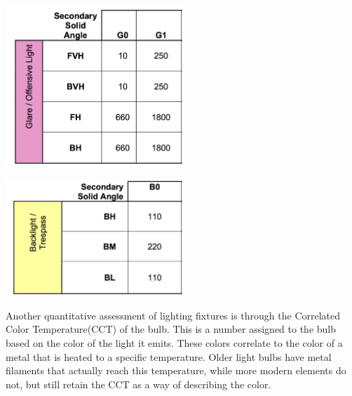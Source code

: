 \documentclass[12pt, oneside]{article}
\begin{document}
\begin{table}[p]
	\centering
	\includegraphics[width=0.5\textwidth]{glare01.jpg}
	\caption[BUG glare rating table]{The amount of lumens allowed in each solid angle - Front Very High (FVH), Back Very High (BVH), Front High (FH), and Back High (BH). This regulates the total amount of light emitted between 60\degree and 90\degree from the nadir.}
	\label{BUGlare2}
\end{table}
\begin{table}[p]
	\centering
	\includegraphics[width=0.5\textwidth]{backrate.jpg}
	\caption[BUG backlighting rating table]{The amount of lumens allowed in each solid angle - Back High (BH), Back Medium (BM), and Back Low (BL). This regulates the total amount of light emitted between 90\degree and 270\degree from the front of the fixture.}
	\label{Back}
\end{table}

Another quantitative assessment of lighting fixtures is through the Correlated Color Temperature(CCT) of the bulb. This is a number assigned to the bulb based on the color of the light it emits. These colors correlate to the color of a metal that is heated to a specific temperature. Older light bulbs have metal filaments that actually reach this temperature, while more modern elements do not, but still retain the CCT as a way of describing the color.

\end{document}
